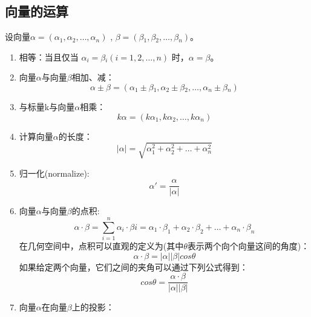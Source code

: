 \documentclass[a4paper,10pt]{article}
\begin{document}
\begin{CJK}{UTF8}{song}
\section{向量的运算}
设向量$\alpha=(\alpha{}_{1},\alpha{}_{2},\ldots{},\alpha{}_{n})$ , $\beta=(\beta{}_{1},\beta{}_{2},\ldots{},\beta{}_{n})$。
\begin{enumerate}
 \item 相等：当且仅当 $\alpha{}_{i}=\beta{}_{i} (i=1,2,\ldots{},n)$ 时，$\alpha=\beta$。
\item 向量$\alpha$与向量$\beta$相加、减：
\begin{displaymath}
\alpha{}\pm{}\beta{}=(\alpha{}_{1}\pm{}\beta{}_{1},\alpha{}_{2}\pm{}\beta{}_{2},\ldots{},\alpha{}_{n}\pm{}\beta{}_{n})
\end{displaymath}
\item 与标量k与向量$\alpha$相乘：
\begin{displaymath}
k\alpha=(k\alpha{}_{1},k\alpha{}_{2},\ldots{},k\alpha{}_{n})
\end{displaymath}
\item 计算向量$\alpha$的长度：
\begin{displaymath}
|\alpha|=\sqrt{\alpha_{1}^{2}+\alpha_{2}^{2}+\ldots{}+\alpha_{n}^{2}}
\end{displaymath}
\item 归一化(normalize):
\begin{displaymath}
\alpha'=\frac{\alpha}{|\alpha|}
\end{displaymath}
\item 向量$\alpha$与向量$\beta$的点积:
\begin{displaymath}
\alpha\cdot\beta=\sum_{i=1}^{n}\alpha_{i}\cdot\beta{i}=\alpha_{1}\cdot\beta_{1}+\alpha_{2}\cdot\beta_{2}+\ldots{}+\alpha_{n}\cdot\beta_{n}
\end{displaymath}
在几何空间中，点积可以直观的定义为(其中$\theta$表示两个向个向量这间的角度)：
\begin{displaymath}
 \alpha\cdot\beta=|\alpha||\beta|cos\theta
\end{displaymath}
如果给定两个向量，它们之间的夹角可以通过下列公式得到：
\begin{displaymath}
cos\theta=\frac{\alpha\cdot\beta}{|\alpha||\beta|}
\end{displaymath}
\item 向量$\alpha$在向量$\beta$上的投影：


\end{enumerate}
\end{CJK}
\end{document}
